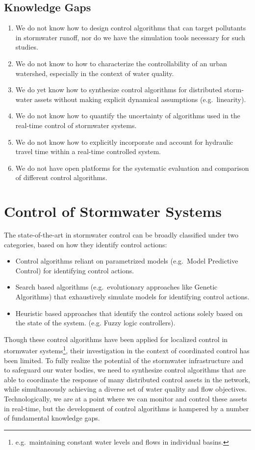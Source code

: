 \subsection*{Knowledge Gaps}
\begin{enumerate}
	\item We do not know how to design control algorithms that can target pollutants in stormwater runoff, nor do we have the simulation tools necessary for such studies.
	\item We do not know to how to characterize the controllability of an urban watershed, especially in the context of water quality.
	\item We do yet know how to synthesize control algorithms for distributed storm-water assets without making explicit dynamical assumptions (e.g.\ linearity).
	\item We do not know how to quantify the uncertainty of algorithms used in the real-time control of stormwater systems.
	\item We do not know how to explicitly incorporate and account for hydraulic travel time within a real-time controlled system.
	\item We do not have open platforms for the systematic evaluation and comparison of different control algorithms.
\end{enumerate}


\section{Control of Stormwater Systems} 
The state-of-the-art in stormwater control can be broadly classified under two categories, based on how they identify control actions:
\begin{itemize}
	\item Control algorithms reliant on parametrized models (e.g.\ Model Predictive Control) for identifying control actions.
	\item Search based algorithms (e.g.\ evolutionary approaches like Genetic Algorithms) that exhaustively simulate models for identifying control actions.
	\item Heuristic based approaches that identify the control actions solely based on the state of the system. (e.g. Fuzzy logic controllers). 
\end{itemize}
Though these control algorithms have been applied for localized control in stormwater systems\footnote{e.g.\ maintaining constant water levels and flows in individual basins.}, their investigation in the context of coordinated control has been limited.
To fully realize the potential of the stormwater infrastructure and to safeguard our water bodies, we need to synthesize control algorithms that are able to coordinate the response of many distributed control assets in the network, while simultaneously achieving a diverse set of water quality and flow objectives. 
Technologically, we are at a point where we can monitor and control these assets in real-time, but the development of control algorithms is hampered by a number of fundamental knowledge gaps.

